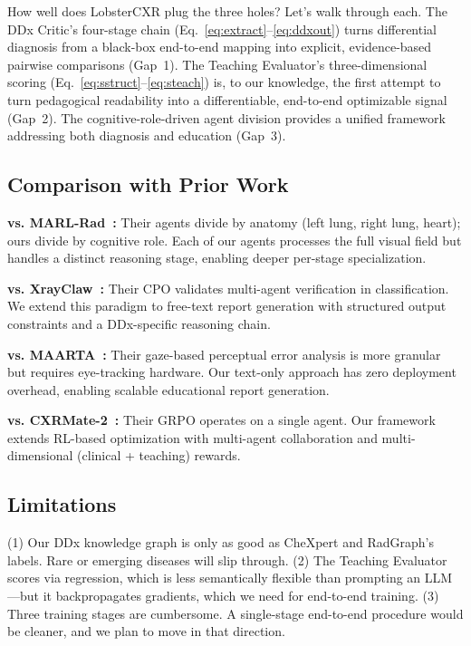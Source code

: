 \documentclass[runningheads,10pt]{llncs}
\begin{document}
How well does LobsterCXR plug the three holes? Let's walk through each. The DDx Critic's four-stage chain (Eq.~\eqref{eq:extract}--\eqref{eq:ddxout}) turns differential diagnosis from a black-box end-to-end mapping into explicit, evidence-based pairwise comparisons (Gap~1). The Teaching Evaluator's three-dimensional scoring (Eq.~\eqref{eq:sstruct}--\eqref{eq:steach}) is, to our knowledge, the first attempt to turn pedagogical readability into a differentiable, end-to-end optimizable signal (Gap~2). The cognitive-role-driven agent division provides a unified framework addressing both diagnosis and education (Gap~3).

\subsection{Comparison with Prior Work}

\textbf{vs. MARL-Rad~\cite{marlrad}:} Their agents divide by anatomy (left lung, right lung, heart); ours divide by cognitive role. Each of our agents processes the full visual field but handles a distinct reasoning stage, enabling deeper per-stage specialization.

\textbf{vs. XrayClaw~\cite{xrayclaw}:} Their CPO validates multi-agent verification in classification. We extend this paradigm to free-text report generation with structured output constraints and a DDx-specific reasoning chain.

\textbf{vs. MAARTA~\cite{maarta}:} Their gaze-based perceptual error analysis is more granular but requires eye-tracking hardware. Our text-only approach has zero deployment overhead, enabling scalable educational report generation.

\textbf{vs. CXRMate-2~\cite{cxrmate2}:} Their GRPO operates on a single agent. Our framework extends RL-based optimization with multi-agent collaboration and multi-dimensional (clinical + teaching) rewards.

\subsection{Limitations}

(1) Our DDx knowledge graph is only as good as CheXpert and RadGraph's labels. Rare or emerging diseases will slip through. (2) The Teaching Evaluator scores via regression, which is less semantically flexible than prompting an LLM---but it backpropagates gradients, which we need for end-to-end training. (3) Three training stages are cumbersome. A single-stage end-to-end procedure would be cleaner, and we plan to move in that direction.
\end{document}
